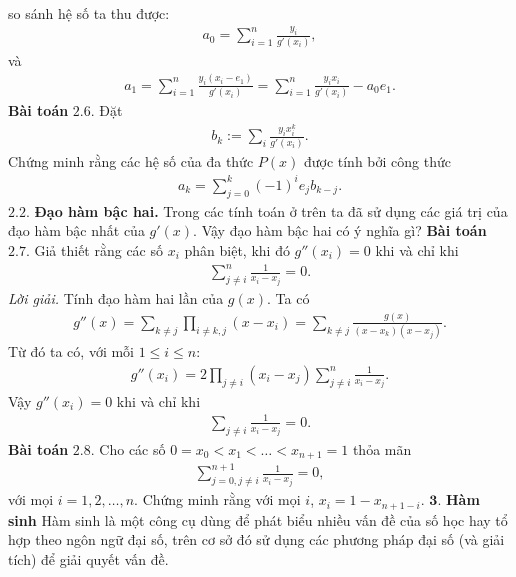 \begin{multicols}{2}
\begin{align*}
	\end{align*}
	so sánh hệ số ta thu được:
	\begin{align*}
		a_0= \sum_{i=1}^n 
		\frac{ y_i}{g'(x_i)} ,
	\end{align*}
	và 
	\begin{align*}
		a_1= \sum_{i=1}^n
		\frac{y_i (x_i-e_1)}{g'(x_i)}=
		\sum_{i=1}^n \frac{y_i  x_i}{g'(x_i)}-a_0e_1.
	\end{align*}
	\textbf{\color{hoccungpi}Bài toán} $\pmb{2.6.}$
	Đặt
	\begin{align*}
		b_k:=\sum_i\frac{y_i x_i^k}{g'(x_i)}.
	\end{align*}
	Chứng minh rằng các hệ số của đa thức $P(x)$ được tính bởi công thức
	\begin{align*}
		a_k=\sum_{j=0}^k(-1)^i e_jb_{k-j}.
	\end{align*}
	$\pmb{2.2.}$ \textbf{\color{hoccungpi}Đạo hàm bậc hai.} Trong các tính toán ở trên ta đã sử dụng các giá trị của đạo hàm bậc nhất của $g'(x)$. Vậy đạo hàm bậc hai có ý nghĩa gì? 
	\vskip 0.1cm
	\textbf{\color{hoccungpi}Bài toán} $\pmb{2.7.}$ Giả thiết rằng các số $x_i$ phân biệt, khi đó $g''(x_i)=0$ khi và chỉ khi
	\begin{align*}
		  \sum
		_{j\neq i}^n\frac1{x_i-x_j}=0.
	\end{align*}
	\textit{Lời giải.} 
	Tính đạo hàm hai lần của $g(x)$. Ta có
	\begin{align*}
		g''(x)=\sum_{k\neq  j}\prod_{i\neq k,j}(x-x_i)= \sum_{k\neq j}\frac{g(x)}{(x-x_k)(x-x_j)}.
	\end{align*}
	Từ đó ta có, với mỗi $1\leq i\leq n$: 
	\begin{align*}
		g''(x_i)=2\prod_{j\neq i}(x_i-x_j)\sum_{j\neq i}^n\frac1{x_i-x_j}.
	\end{align*}
	Vậy $g''(x_i)=0$ khi và chỉ khi
	\begin{align*}
		\sum_{j\neq i}\frac1{x_i-x_j}=0.
	\end{align*}  
	\textbf{\color{hoccungpi}Bài toán} $\pmb{2.8.}$
	Cho các số $0=x_0<x_1<\ldots<x_{n+1}=1$ thỏa mãn
	\begin{align*}
		\sum_{j=0,j\neq i}^{n+1}\frac1{x_i-x_j}=0,
	\end{align*}
	với mọi $i=1,2,\ldots,n$. Chứng minh rằng với mọi $i$, $x_i=1-x_{n+1-i}$.
	\vskip 0.1cm 
	$\pmb{3.}$ \textbf{\color{hoccungpi}Hàm sinh}
	\vskip 0.1cm
	Hàm sinh là một  công cụ dùng để phát biểu nhiều vấn đề của số học hay tổ hợp theo ngôn ngữ đại số, trên cơ sở đó sử dụng các phương pháp đại số (và giải tích) để giải quyết vấn đề. 
	\vskip 0.1cm

\end{multicols}
